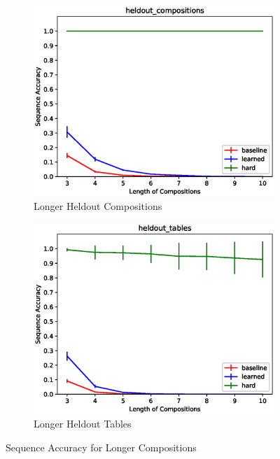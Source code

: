 \begin{figure}[H] 
	\begin{subfigure}[b]{0.5\linewidth}
		\centering
		\includegraphics[width=0.95\linewidth]{./figs/lookup/heldout_compositions_eps}
		\caption{Longer Heldout Compositions} 
		\label{lt_longer1} 
		\vspace{2ex}
	\end{subfigure}%
	\begin{subfigure}[b]{0.5\linewidth}
		\centering
		\includegraphics[width=0.95\linewidth]{./figs/lookup/heldout_tables_eps}
		\caption{Longer Heldout Tables} 
		\label{lt_longer2} 
		\vspace{2ex}
	\end{subfigure}
	\caption{Sequence Accuracy for Longer Compositions}
	\label{lt_longer}
\end{figure}

